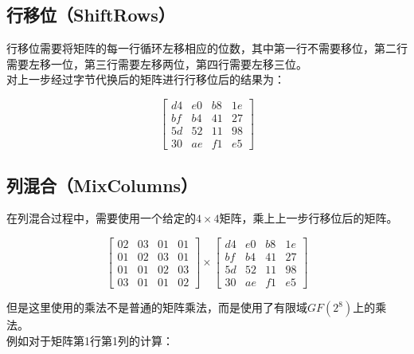 \vspace{0.5cm}

\subsection{行移位（ShiftRows）}

行移位需要将矩阵的每一行循环左移相应的位数，其中第一行不需要移位，第二行需要左移一位，第三行需要左移两位，第四行需要左移三位。\\

对上一步经过字节代换后的矩阵进行行移位后的结果为：

$$
    \begin{bmatrix}
        d4 & e0 & b8 & 1e \\
        bf & b4 & 41 & 27 \\
        5d & 52 & 11 & 98 \\
        30 & ae & f1 & e5
    \end{bmatrix}
$$

\vspace{0.5cm}

\subsection{列混合（MixColumns）}

在列混合过程中，需要使用一个给定的$ 4 \times 4 $矩阵，乘上上一步行移位后的矩阵。

$$
    \begin{bmatrix}
        02 & 03 & 01 & 01 \\
        01 & 02 & 03 & 01 \\
        01 & 01 & 02 & 03 \\
        03 & 01 & 01 & 02
    \end{bmatrix}
    \times
    \begin{bmatrix}
        d4 & e0 & b8 & 1e \\
        bf & b4 & 41 & 27 \\
        5d & 52 & 11 & 98 \\
        30 & ae & f1 & e5
    \end{bmatrix}
$$

\vspace{0.5cm}

但是这里使用的乘法不是普通的矩阵乘法，而是使用了有限域$ GF(2^8) $上的乘法。\\

例如对于矩阵第1行第1列的计算：

\vspace{-1cm}

